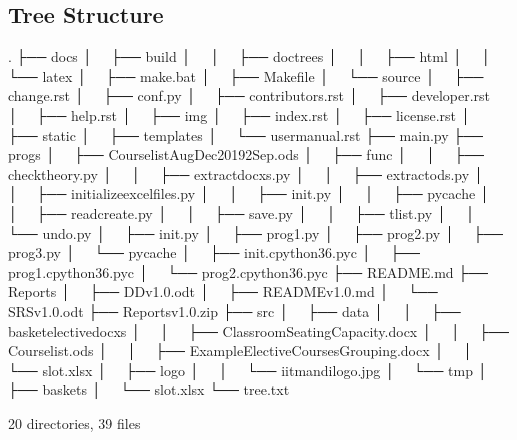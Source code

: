 \documentclass[letterpaper,10pt,english]{sphinxmanual}
\begin{document}
\subsection{Tree Structure}
\label{\detokenize{developer:tree-structure}}
\begin{sphinxVerbatim}[commandchars=\\\{\}]
.
├── docs
│   ├── build
│   │   ├── doctrees
│   │   ├── html
│   │   └── latex
│   ├── make.bat
│   ├── Makefile
│   └── source
│       ├── change.rst
│       ├── conf.py
│       ├── contributors.rst
│       ├── developer.rst
│       ├── help.rst
│       ├── img
│       ├── index.rst
│       ├── license.rst
│       ├── \PYGZus{}static
│       ├── \PYGZus{}templates
│       └── user\PYGZus{}manual.rst
├── main.py
├── progs
│   ├── CourselistAug\PYGZhy{}Dec2019\PYGZus{}2Sep.ods
│   ├── func
│   │   ├── checktheory.py
│   │   ├── extract\PYGZus{}docxs.py
│   │   ├── extract\PYGZus{}ods.py
│   │   ├── initialize\PYGZus{}excel\PYGZus{}files.py
│   │   ├── \PYGZus{}\PYGZus{}init\PYGZus{}\PYGZus{}.py
│   │   ├── \PYGZus{}\PYGZus{}pycache\PYGZus{}\PYGZus{}
│   │   ├── read\PYGZus{}create.py
│   │   ├── save.py
│   │   ├── tlist.py
│   │   └── undo.py
│   ├── \PYGZus{}\PYGZus{}init\PYGZus{}\PYGZus{}.py
│   ├── prog1.py
│   ├── prog2.py
│   ├── prog3.py
│   └── \PYGZus{}\PYGZus{}pycache\PYGZus{}\PYGZus{}
│       ├── \PYGZus{}\PYGZus{}init\PYGZus{}\PYGZus{}.cpython\PYGZhy{}36.pyc
│       ├── prog1.cpython\PYGZhy{}36.pyc
│       └── prog2.cpython\PYGZhy{}36.pyc
├── README.md
├── Reports
│   ├── DD\PYGZus{}v1.0.odt
│   ├── README\PYGZus{}v1.0.md
│   └── SRS\PYGZus{}v1.0.odt
├── Reports\PYGZus{}v1.0.zip
├── src
│   ├── data
│   │   ├── basket\PYGZus{}elective\PYGZus{}docxs
│   │   ├── ClassroomSeatingCapacity.docx
│   │   ├── Courselist.ods
│   │   ├── ExampleElectiveCoursesGrouping.docx
│   │   └── slot.xlsx
│   ├── logo
│   │   └── iitmandilogo.jpg
│   └── tmp
│       ├── baskets
│       └── slot.xlsx
└── tree.txt


20 directories, 39 files
\end{sphinxVerbatim}
\end{document}
